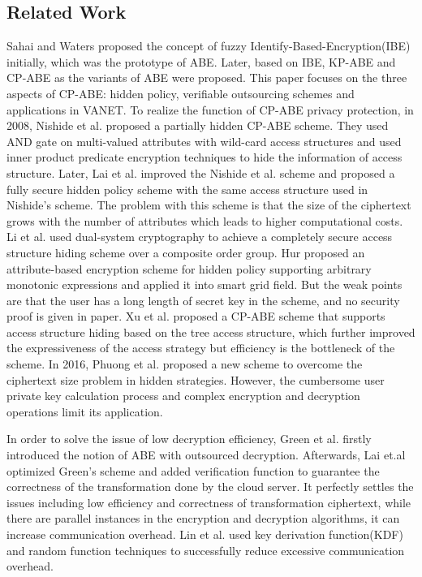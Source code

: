 \documentclass[smallextended]{svjour3}       %
\begin{document}
	

\subsection{Related Work}
	Sahai and Waters proposed the concept of fuzzy Identify-Based-Encryption(IBE) initially, which was the prototype of ABE.
	Later, based on IBE, KP-ABE and CP-ABE as the variants of ABE were proposed.
	This paper focuses on the three aspects of CP-ABE: hidden policy, verifiable outsourcing schemes and applications in VANET.
	To realize the function of CP-ABE privacy protection, in 2008, Nishide et al. proposed a partially hidden CP-ABE scheme.
	They used AND gate on multi-valued attributes with wild-card access structures and used inner product predicate encryption techniques to hide the information of access structure.
	Later, Lai et al. improved the Nishide et al. scheme and proposed a fully secure hidden policy scheme with the same access structure used in Nishide's scheme.
	The problem with this scheme is that the size of the ciphertext grows with the number of attributes which leads to higher computational costs. 
	Li et al. used dual-system cryptography to achieve a completely secure access structure hiding scheme over a composite order group.
	Hur proposed an attribute-based encryption scheme for hidden policy supporting arbitrary monotonic expressions and applied it into smart grid field.
	But the weak points are that the user has a long length of secret key in the scheme, and no security proof is given in paper.
	Xu et al. proposed a CP-ABE scheme that supports access structure hiding based on the tree access structure, which further improved the expressiveness of the access strategy but efficiency is the bottleneck of the scheme.
	In 2016, Phuong et al. proposed a new scheme to overcome the ciphertext size problem in hidden strategies. However, the cumbersome user private key calculation process and complex encryption and decryption operations limit its application.
	

	In order to solve the issue of low decryption efficiency, Green et al. firstly introduced the notion of ABE with outsourced decryption.
	Afterwards, Lai et.al optimized Green’s scheme and added verification function to guarantee the correctness of the transformation done by the cloud server.
	It perfectly settles the issues including low efficiency and correctness of transformation ciphertext, while there are parallel instances in the encryption and decryption algorithms, it can increase communication overhead.
	Lin et al. used key derivation function(KDF) and random function techniques to successfully reduce excessive communication overhead.
\end{document}
